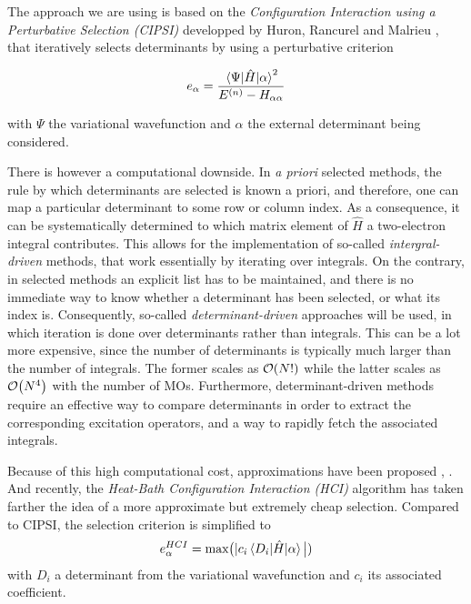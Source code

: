 \documentclass[./thesis.tex]{subfiles}
\begin{document}
The approach we are using is based on the \emph{Configuration Interaction using a Perturbative Selection (CIPSI)} developped by Huron, Rancurel and Malrieu \cite{Huron_1973}, that iteratively selects determinants by using a perturbative criterion

\begin{equation}
e_\alpha = \frac{\mel{\Psi}{\hat{H}}{\alpha}^2}{E^{(n)} - H_{\alpha \alpha}}
\end{equation}

with $\Psi$ the variational wavefunction and $\alpha$ the external determinant being considered.



There is however a computational downside. In \textit{a priori} selected methods, the rule by which determinants are selected is known a priori, and therefore, one can map a particular determinant to some row or column index.\cite{Knowles_1984} As a consequence, it can be systematically determined to which matrix element of $\widehat{H}$ a two-electron integral contributes. This allows for the implementation of so-called \emph{intergral-driven} methods, that work essentially by iterating over integrals.
On the contrary, in selected methods an explicit list has to be maintained, and there is no immediate way to know whether a determinant has been selected, or what its index is. Consequently, so-called \emph{determinant-driven} approaches will be used, in which iteration is done over determinants rather than integrals. This can be a lot more expensive, since the number of determinants is typically much larger than the number of integrals. The former scales as $\order{N!}$ while the latter scales as $\order{N^4}$ with the number of MOs.
Furthermore, determinant-driven methods require an effective way to compare determinants in order to extract the corresponding excitation operators, and a way to rapidly fetch the associated integrals.

Because of this high computational cost, approximations have been proposed \cite{Evangelisti_1983},  . And recently, the \emph{Heat-Bath Configuration Interaction (HCI)} algorithm has taken farther the idea of a more approximate but extremely cheap selection\cite{Holmes_2016, Sharma_2017}. Compared to CIPSI, the selection criterion is simplified to
\begin{equation}
e^{HCI}_\alpha = \text{max} \big  {(|} c_i \mel{D_i}{\hat{H}}{\alpha} \big {|)}
\end{equation}
with $D_i$ a determinant from the variational wavefunction and $c_i$ its associated coefficient.
\end{document}
